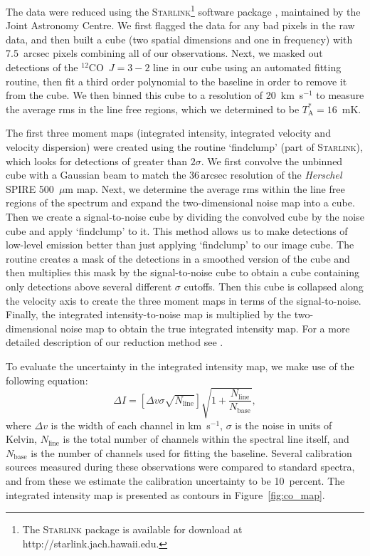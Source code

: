 The data were reduced using the \textsc{Starlink}\footnote{The \textsc{Starlink} package is available for download at http://starlink.jach.hawaii.edu.} software package \citep{2008ASPC..394..650C}, maintained by the Joint Astronomy Centre.  We first flagged the data for any bad pixels in the raw data, and then built a cube (two spatial dimensions and one in frequency) with 7.5~arcsec pixels combining all of our observations.  Next, we masked out detections of the $^{12}$CO~$J = 3-2$ line in our cube using an automated fitting routine, then fit a third order polynomial to the baseline in order to remove it from the cube.  We then binned this cube to a resolution of 20~km~s$^{-1}$ to measure the average rms in the line free regions, which we determined to be $T_{\mathrm{A}}^{\ast} = 16$~mK.

The first three moment maps (integrated intensity, integrated velocity and velocity dispersion) were created using the routine `findclump' (part of \textsc{Starlink}), which looks for detections of greater than $2\sigma$.  We first convolve the unbinned cube with a Gaussian beam to match the 36\,arcsec resolution of the \emph{Herschel} SPIRE 500~$\mu$m map.  Next, we determine the average rms within the line free regions of the spectrum and expand the two-dimensional noise map into a cube.  Then we create a signal-to-noise cube by dividing the convolved cube by the noise cube and apply `findclump' to it.  This method allows us to make detections of low-level emission better than just applying `findclump' to our image cube.  The routine creates a mask of the detections in a smoothed version of the cube and then multiplies this mask by the signal-to-noise cube to obtain a cube containing only detections above several different $\sigma$ cutoffs.  Then this cube is collapsed along the velocity axis to create the three moment maps in terms of the signal-to-noise.  Finally, the integrated intensity-to-noise map is multiplied by the two-dimensional noise map to obtain the true integrated intensity map.  For a more detailed description of our reduction method see \citet{2010ApJ...714..571W}.

To evaluate the uncertainty in the integrated intensity map, we make use of the following equation:
\begin{equation}
 \Delta I = \left[ \Delta v \sigma \sqrt{N_{\mathrm{line}}} \right] \sqrt{1 + \frac{N_{\mathrm{line}}}{N_{\mathrm{base}}}},
\end{equation}
where $\Delta v$ is the width of each channel in km~s$^{-1}$, $\sigma$ is the noise in units of Kelvin, $N_{\mathrm{line}}$ is the total number of channels within the spectral line itself, and $N_{\mathrm{base}}$ is the number of channels used for fitting the baseline.  Several calibration sources measured during these observations were compared to standard spectra, and from these we estimate the calibration uncertainty to be 10~percent.  The integrated intensity map is presented as contours in Figure~\ref{fig:co_map}.

